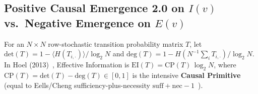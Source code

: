 \documentclass[11pt,a4paper]{article}
\theoremstyle{definition}
\theoremstyle{remark}
\begin{document}
\subsection{Positive Causal Emergence 2.0 on $I(v)$ vs.\ Negative Emergence on $E(v)$}

For an $N \times N$ row-stochastic transition probability matrix $T$, let $\mathrm{det}(T) = 1 - \langle H(T_{i,\cdot})\rangle / \log_2 N$ and $\mathrm{deg}(T) = 1 - H(N^{-1}\sum_i T_{i,\cdot}) / \log_2 N$. In Hoel (2013)~\cite{Hoel2013PNAS}, Effective Information is $\mathrm{EI}(T) = \mathrm{CP}(T)\,\log_2 N$, where $\mathrm{CP}(T) = \mathrm{det}(T) - \mathrm{deg}(T) \in [0, 1]$ is the intensive \textbf{Causal Primitive} (equal to Eells/Cheng sufficiency-plus-necessity $\mathrm{suff} + \mathrm{nec} - 1$~\cite{ComolattiHoel2025,Hoel2026Patterns}).
\end{document}
